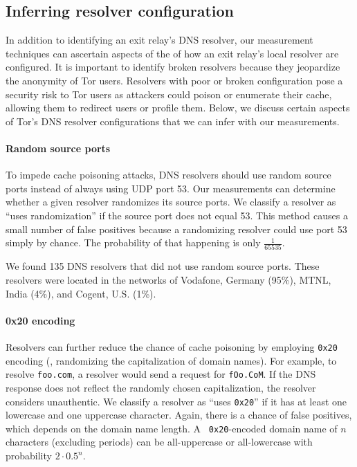 
\iffalse
\subsection{Inferring resolver configuration}
\label{sec:mapping-configuration}

In addition to identifying an exit relay's DNS resolver, our measurement
techniques can ascertain aspects of the of how an exit relay's local
resolver are configured.  It is important to identify broken resolvers
because they jeopardize the anonymity of Tor users.  Resolvers with poor
or broken configuration pose a security risk to Tor users as attackers
could poison or enumerate their cache, allowing them to redirect users
or profile them. Below, we discuss certain aspects of Tor's DNS resolver
configurations that we can infer with our measurements.

\paragraph{Random source ports}
To impede cache poisoning attacks, DNS resolvers should use random
source ports instead of always using UDP port 53.  Our measurements can
determine whether a given resolver randomizes its source ports.  We
classify a resolver as ``uses randomization'' if the source port does
not equal 53.  This method causes a small number of false positives
because a randomizing resolver could use port 53 simply by chance.  The
probability of that happening is only $\frac{1}{65535}$.

We found 135 DNS resolvers that did not use random source ports.  These
resolvers were located in the networks of Vodafone, Germany (95\%), MTNL, India
(4\%), and Cogent, U.S. (1\%).

\paragraph{0x20 encoding}
Resolvers can further reduce the chance of cache poisoning by employing
{\tt 0x20} encoding (\ie, randomizing the capitalization of domain
names).  For example, to resolve {\tt foo.com}, a resolver would send a
request for {\tt fOo.CoM}.  If the DNS response does not reflect the
randomly chosen capitalization, the resolver considers unauthentic.  We
classify a resolver as ``uses {\tt 0x20}'' if it has at least one
lowercase and one uppercase character.  Again, there is a chance of
false positives, which depends on the domain name length.  A {\tt
  0x20}-encoded domain name of $n$ characters (excluding periods) can be
all-uppercase or all-lowercase with probability $2 \cdot 0.5^n$.

